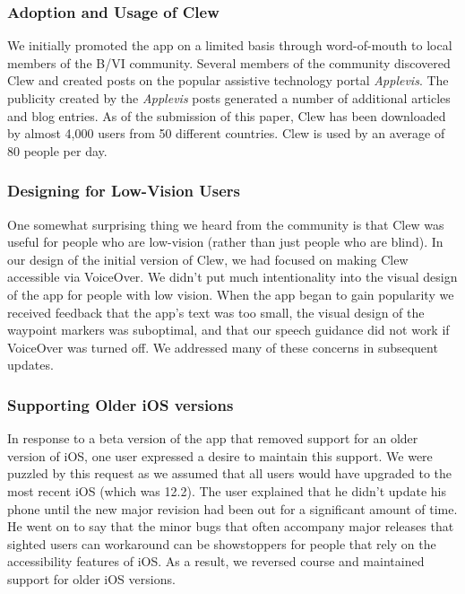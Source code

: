 \documentclass[chi_draft]{sigchi}
\newcommand{\BVI}{B/VI\xspace}
\begin{document}
\subsubsection{Adoption and Usage of Clew}

We initially promoted the app on a limited basis through word-of-mouth to local members of the \BVI community.  Several members of the community discovered Clew and created posts on the popular assistive technology portal \emph{Applevis}.  The publicity created by the \emph{Applevis} posts generated a number of additional articles and blog entries.  As of the submission of this paper, Clew has been downloaded by almost 4,000 users from 50 different countries.  Clew is used by an average of 80 people per day.


\subsubsection{Designing for Low-Vision Users}
One somewhat surprising thing we heard from the community is that Clew was useful for people who are low-vision (rather than just people who are blind).  In our design of the initial version of Clew, we had focused on making Clew  accessible via VoiceOver.  We didn't put much intentionality into the visual design of the app for people with low vision.  When the app began to gain popularity we received feedback that the app's text was too small, the visual design of the waypoint markers was suboptimal, and that our speech guidance did not work if VoiceOver was turned off.  We addressed many of these concerns in subsequent updates.

\subsubsection{Supporting Older iOS versions}

In response to a beta version of the app that removed support for an older version of iOS, one user expressed a desire to maintain this support.  We were puzzled by this request as we assumed that all users would have upgraded to the most recent iOS (which was 12.2).  The user explained that he didn't update his phone until the new major revision had been out for a significant amount of time.  He went on to say that the minor bugs that often accompany major releases that sighted users can workaround can be showstoppers for people that rely on the accessibility features of iOS.  As a result, we reversed course and maintained support for older iOS versions.
\end{document}
